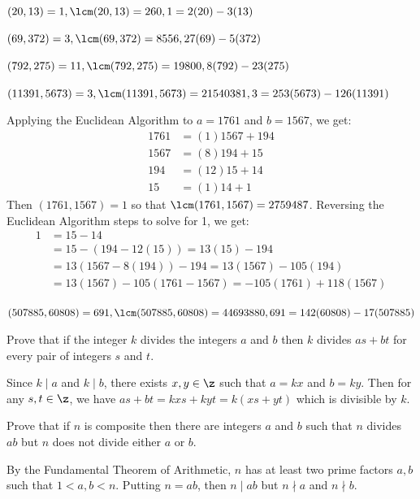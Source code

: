 \begin{problems}
\begin{solalph}
        $(20, 13) = 1, \lcm(20, 13) = 260, 1 = 2(20) - 3(13)$
        \item $(69, 372) = 3,\lcm(69, 372) = 8556, 27(69) -5(372)$
        \item $(792, 275) = 11, \lcm(792, 275) = 19800, 8(792) - 23(275)$
        \item $(11391, 5673) = 3 ,\lcm(11391, 5673) = 21540381, 3 = 253(5673) - 126(11391)$
        \item Applying the Euclidean Algorithm to $a = 1761$ and $b = 1567$, we get:
        \begin{align*}
            1761 & = (1)1567 + 194 \\
            1567 & = (8)194 + 15 \\
            194 & = (12)15 + 14 \\
            15 & = (1)14 + 1
        \end{align*}
        Then $(1761, 1567) = 1$ so that $\lcm(1761, 1567) = 2759487$. Reversing the Euclidean Algorithm steps to solve for 1, we get:
        \begin{align*}
            1 & = 15 - 14 \\
            & = 15 - (194 - 12(15)) = 13(15) - 194 \\
            & = 13(1567 - 8(194)) - 194 = 13(1567) - 105(194) \\
            & = 13(1567) - 105(1761 - 1567) = -105(1761) + 118(1567)
        \end{align*}
        \item $(507885, 60808) = 691, \lcm(507885, 60808) = 44693880, 691 = 142(60808) - 17(507885)$
    \end{solalph}
    \item Prove that if the integer $k$ divides the integers $a$ and $b$ then $k$ divides $as + bt$ for every pair of integers $s$ and $t$. 
    \begin{sol}
        Since $k \mid a$ and $k \mid b$, there exists $x, y \in \z$ such that $a = kx$ and $b = ky$. Then for any $s, t \in \z$, we have $as + bt = kxs + kyt = k(xs + yt)$ which is divisible by $k$.
    \end{sol}
    \item Prove that if $n$ is composite then there are integers $a$ and $b$ such that $n$ divides $ab$ but $n$ does not divide either $a$ or $b$.
    \begin{sol}
        By the Fundamental Theorem of Arithmetic, $n$ has at least two prime factors $a, b$ such that $1 < a, b < n$. Putting $n = ab$, then $n \mid ab$ but $n \nmid a$ and $n \nmid b$.

\end{sol}
\end{problems}
